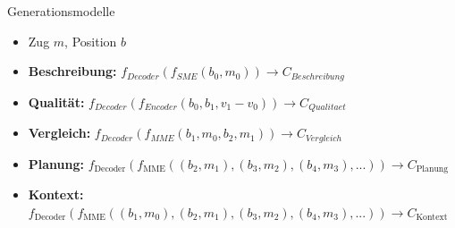 \begin{frame}{Generationsmodelle}
\begin{itemize}[<+->]
	\item Zug $m$, Position $b$ 
	\item \textbf{Beschreibung:} $f_{Decoder}(f_{SME}(b_0,m_0)) \rightarrow C_{Beschreibung}$
	\item \textbf{Qualität:} $f_{Decoder}(f_{Encoder}(b_0,b_1,v_1-v_0)) \rightarrow C_{Qualitaet}$
	\item \textbf{Vergleich:} $f_{Decoder}(f_{MME}(b_1,m_0,b_2,m_1)) \rightarrow C_{Vergleich}$
	\item \textbf{Planung:} $f_{\text{Decoder}}(f_{\text{MME}}((b_2,m_1),(b_3,m_2),(b_4,m_3),...)) \rightarrow C_{\text{Planung}}$
	\item \textbf{Kontext:} $f_{\text{Decoder}}(f_{\text{MME}}((b_1,m_0),(b_2,m_1),(b_3,m_2),(b_4,m_3),...)) \rightarrow C_{\text{Kontext}}$
\end{itemize}
\end{frame}
